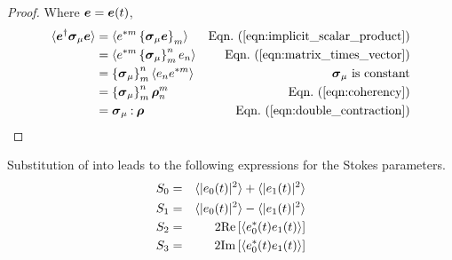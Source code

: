 
\begin{proof}
Where $\mbox{\boldmath $e$}=\mbox{\boldmath $e$}(t)$,
\begin{align*}
\langle \Jcol{e}^\dagger \pauli{\irow} \Jcol{e} \rangle
& = \langle e^{*m} \left\{\pauli{\irow} \Jcol{e}\right\}_m \rangle
    & \peqn{implicit_scalar_product} \\
&= \langle e^{*m} \left\{\pauli{\irow}\right\}_m^n e_n \rangle 
    & \peqn{matrix_times_vector} \\
&= \left\{\pauli{\irow}\right\}_m^n \langle e_n e^{*m} \rangle
    & \pauli{\irow}\ \text{is constant} \\
&= \left\{\pauli{\irow}\right\}_m^n \cohM{\rho}_n^m 
    & \peqn{coherency} \\
&= \pauli{\irow} \dcbo \cohM{\rho}
    & \peqn{double_contraction}
\end{align*}
\end{proof}

\fi

Substitution of  into  leads to the following expressions for the Stokes parameters.
\begin{eqnarray}
 S_0&=&\langle|e_0(t)|^2\rangle+\langle|e_1(t)|^2\rangle\label{eqn:StokesI} \\
 S_1&=&\langle|e_0(t)|^2\rangle-\langle|e_1(t)|^2\rangle\label{eqn:StokesQ} \\
 S_2&=&2{\rm Re} \left[ {\langle e_0^*(t) e_1(t)\rangle} \right] \label{eqn:StokesU} \\
 S_3&=&2{\rm Im} \left[ {\langle e_0^*(t) e_1(t)\rangle} \right] \label{eqn:StokesV}
\end{eqnarray}

